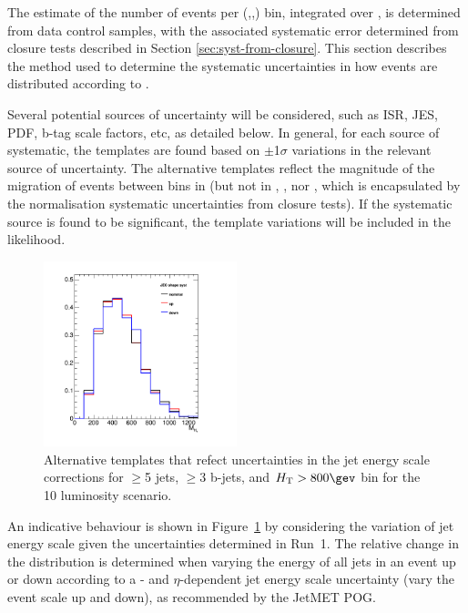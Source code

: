 The estimate of the number of events per (\njet,\nb,\scalht) bin,
integrated over \mht, is determined from data control samples, with
the associated systematic error determined from closure tests
described in Section \ref{sec:syst-from-closure}. This section
describes the method used to determine the systematic uncertainties in
how events are distributed according to \mht. 

Several potential sources of uncertainty will be considered, such as
ISR, JES, PDF, b-tag scale factors, etc, as detailed below. In
general, for each source of systematic, the \mht templates are found
based on $\pm$1$\sigma$ variations in the relevant source of
uncertainty. The alternative templates reflect the magnitude of the
migration of events between bins in \mht (but not in \njet, \nb, nor
\scalht, which is encapsulated by the normalisation systematic
uncertainties from closure tests). If the systematic source is found
to be significant, the template variations will be included in the
likelihood. 

\begin{figure}[]
  \centering
  \includegraphics[width=0.5\textwidth]{figures/closureTests/mhtJetSyst_SMS_T1bbbb_2J_mGl1000_mLSP900_JEC_ge3b_ge5j_800_1600.png}
  \caption{\label{fig:jec-shape} Alternative \mht templates that
    refect uncertainties in the jet energy scale corrections for
    $\geq$5 jets, $\geq$3 b-jets, and $\scalht > 800\gev$ bin for the
    10 \ifb luminosity scenario.}
\end{figure}

An indicative behaviour is shown in Figure~\ref{fig:jec-shape} by
considering the variation of jet energy scale given the uncertainties
determined in Run~1. The relative change in the \mht distribution is
determined when varying the energy of all jets in an event up or down
according to a \pt- and $\eta$-dependent jet energy scale uncertainty
(\ie vary the event scale up and down), as recommended by the JetMET
POG. 

